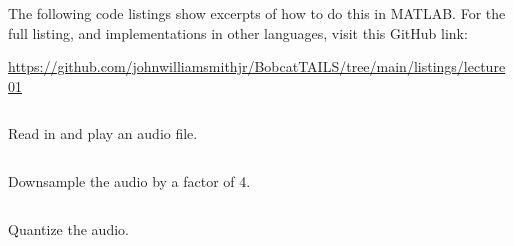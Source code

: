 \documentclass[11pt]{article}
\begin{document}
The following code listings show excerpts of how to do this in MATLAB. For the full listing, and implementations in other languages, visit this GitHub link:

\noindent
\href{https://github.com/johnwilliamsmithjr/BobcatTAILS/tree/main/listings/lecture01}{https://github.com/johnwilliamsmithjr/BobcatTAILS/tree/main/listings/lecture01}


\begin{listing}
    \inputminted[firstline=8, lastline=13]{Matlab}{../listings/lecture01/audiotest.m}
    \caption{Read in and play an audio file.}
    \label{lst:matlab read and play audio}
\end{listing}

\begin{listing}
    \inputminted[firstline=49, lastline=51]{Matlab}{../listings/lecture01/audiotest.m}
    \caption{Downsample the audio by a factor of 4.}
    \label{lst:matlab downsample audio}
\end{listing}

\begin{listing}
    \inputminted[firstline=68, lastline=79]{Matlab}{../listings/lecture01/audiotest.m}
    \caption{Quantize the audio.}
    \label{lst:matlab quantization}
\end{listing}






\clearpage


\end{document}
